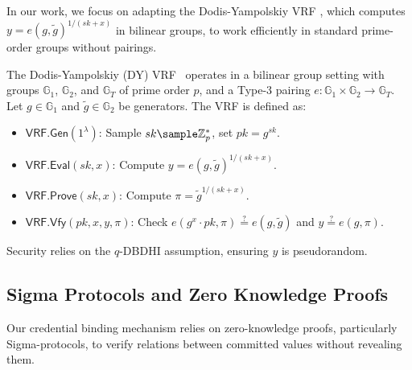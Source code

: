     
In our work, we focus on adapting the Dodis-Yampolskiy VRF \cite{hutchison_verifiable_2005}, which computes $y = e(g, \tilde{g})^{1/(sk+x)}$ in bilinear groups, to work efficiently in standard prime-order groups without pairings.

\begin{definition}
    The Dodis-Yampolskiy (DY) VRF~\cite{hutchison_verifiable_2005} operates in a bilinear group setting with groups $\mathbb{G}_1$, $\mathbb{G}_2$, and $\mathbb{G}_T$ of prime order $p$, and a Type-3 pairing $e: \mathbb{G}_1 \times \mathbb{G}_2 \to \mathbb{G}_T$. Let $g \in \mathbb{G}_1$ and $\tilde{g} \in \mathbb{G}_2$ be generators. The VRF is defined as:

\begin{itemize}
    \item $\mathsf{VRF.Gen}(1^\lambda)$: Sample $sk \sample \mathbb{Z}_p^*$, set $pk = g^{sk}$.
    \item $\mathsf{VRF.Eval}(sk, x)$: Compute $y = e(g, \tilde{g})^{1/(sk + x)}$.
    \item $\mathsf{VRF.Prove}(sk, x)$: Compute $\pi = \tilde{g}^{1/(sk + x)}$.
    \item $\mathsf{VRF.Vfy}(pk, x, y, \pi)$: Check $e(g^{x} \cdot pk, \pi) \stackrel{?}{=} e(g, \tilde{g})$ and $y \stackrel{?}{=} e(g, \pi)$.
\end{itemize}

Security relies on the $q$-DBDHI assumption, ensuring $y$ is pseudorandom.

\end{definition}



\subsection{Sigma Protocols and Zero Knowledge Proofs}
Our credential binding mechanism relies on zero-knowledge proofs, particularly Sigma-protocols, to verify relations between committed values without revealing them.

